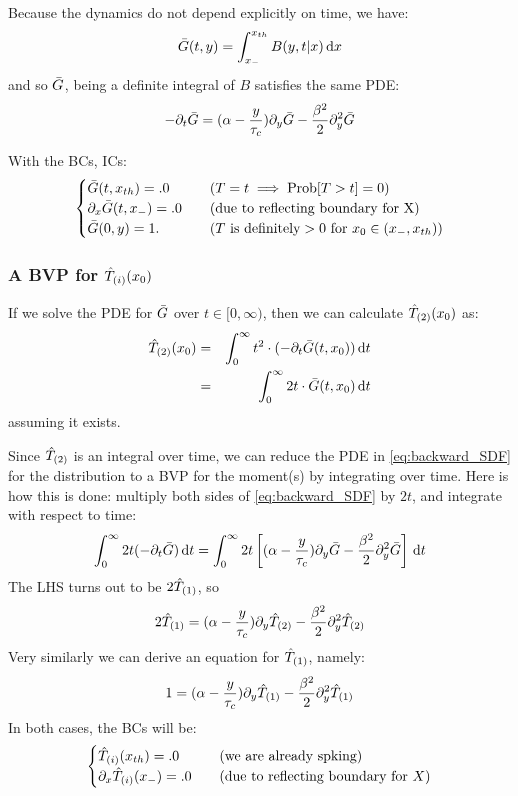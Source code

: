 \documentclass{article}
\begin{document}
Because the dynamics do not depend explicitly on time, we have:
$$
{ \bar{G} }(t,y) = \int_{ x_{-} }^{ x_{th} } B(y,t|x) \, \mathrm{d} x
$$
and so ${ \bar{G} }$, being a definite integral of $B$ satisfies the same PDE:
\begin{equation}
-{\partial}_t { \bar{G} } = ({\alpha} - \frac y{{ \tau_{c} }}) {\partial}_y{ \bar{G} } - \frac {{\beta}^2} 2 {\partial}_y^2 { \bar{G} }
\label{eq:backward_SDF}
\end{equation}

With the BCs, ICs:
\begin{equation}
\begin{cases}
{ \bar{G} }(t,{ x_{th} }) = .0 & \quad (T = t \implies \operatorname{Prob}[T>t] = 0)
\\
{\partial}_x { \bar{G} }(t,{ x_{-} }) = .0  & \quad (\textrm{due to reflecting boundary for X})
\\
{ \bar{G} }(0, y) = 1. & \quad (T \textrm{ is definitely} > 0 \textrm{ for } x_0 \in
({ x_{-} }, { x_{th} }) )
\end{cases}
\end{equation}

\subsubsection{A BVP for ${ \hat{T}_{(i)} }(x_0)$}
If we solve the PDE for ${ \bar{G} }$ over $t \in [0,\infty)$, then we can calculate
${ \hat{T}_{(2)} }(x_0)$ as:
\begin{eqnarray}
{ \hat{T}_{(2)} }(x_0) &=& \int_0^\infty t^2 \cdot (-{\partial}_t{ \bar{G} }(t,x_0)) \, \mathrm{d} t
\\
		   &=& \int_0^\infty 2t \cdot { \bar{G} }(t,x_0) \, \mathrm{d} t
\end{eqnarray}
assuming it exists.

Since ${ \hat{T}_{(2)} }$ is an integral over time, we can reduce the PDE in
\cref{eq:backward_SDF} for the distribution to a BVP for the moment(s) by
integrating over time. Here is how this is done: multiply both sides  of
\cref{eq:backward_SDF} by $2t$, and integrate with respect to time:
\begin{equation}
\int_0^\infty 2t (-{\partial}_t { \bar{G} }) \, \mathrm{d} t
= 
\int_0^\infty  2t \left[ ({\alpha} - \frac y{{ \tau_{c} }}) {\partial}_y{ \bar{G} } - \frac {{\beta}^2} 2
{\partial}_y^2 { \bar{G} }\right]
\, \mathrm{d} t
\end{equation}
The LHS turns out to be $2{ \hat{T}_{(1)} }$, so 
\begin{equation}
2{ \hat{T}_{(1)} }
=({\alpha} - \frac y{{ \tau_{c} }})   {\partial}_y { \hat{T}_{(2)} } 
- \frac {{\beta}^2} 2
{\partial}_y^2 { \hat{T}_{(2)} }
\label{eq:BVP_Ttwo}
\end{equation}
Very similarly we can derive an equation for ${ \hat{T}_{(1)} }$, namely:
\begin{equation}
1
=({\alpha} - \frac y{{ \tau_{c} }})   {\partial}_y { \hat{T}_{(1)} } 
- \frac {{\beta}^2} 2
{\partial}_y^2 { \hat{T}_{(1)} }
\label{eq:BVP_Tone}
\end{equation}
In both cases, the BCs will be:
\begin{equation}
\begin{cases}
{ \hat{T}_{(i)} }({ x_{th} }) = .0 & \quad (\textrm{we are already spking})
\\
{\partial}_x { \hat{T}_{(i)} }({ x_{-} }) = .0  & \quad (\textrm{due to reflecting boundary for }X)
\end{cases}
\label{eq:BVP_Ti_BCs}
\end{equation}
\end{document}
